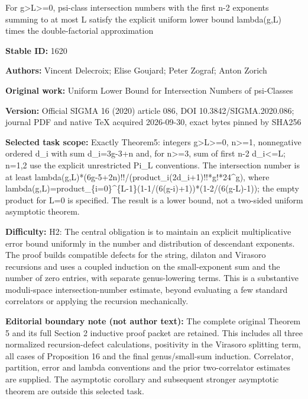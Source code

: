 \documentclass[11pt]{article}
\theoremstyle{definition}
\begin{document}
\begin{center}\Large For g>L>=0, psi-class intersection numbers with the first n-2 exponents summing to at most L satisfy the explicit uniform lower bound lambda(g,L) times the double-factorial approximation\end{center}
\noindent\textbf{Stable ID:} 1620\par
\noindent\textbf{Authors:} Vincent Delecroix; Elise Goujard; Peter Zograf; Anton Zorich\par
\noindent\textbf{Original work:} Uniform Lower Bound for Intersection Numbers of psi-Classes\par
\noindent\textbf{Version:} Official SIGMA 16 (2020) article 086, DOI 10.3842/SIGMA.2020.086; journal PDF and native TeX acquired 2026-09-30, exact bytes pinned by SHA256\par
\noindent\textbf{Selected task scope:} Exactly Theorem5: integers g>L>=0, n>=1, nonnegative ordered d\_i with sum d\_i=3g-3+n and, for n>=3, sum of first n-2 d\_i<=L; n=1,2 use the explicit unrestricted Pi\_L conventions. The intersection number is at least lambda(g,L)*(6g-5+2n)!!/(product\_i(2d\_i+1)!!*g!*24\textasciicircum{}g), where lambda(g,L)=product\_\{i=0\}\textasciicircum{}\{L-1\}(1-1/(6(g-i)+1))*(1-2/(6(g-L)-1)); the empty product for L=0 is specified. The result is a lower bound, not a two-sided uniform asymptotic theorem.\par
\noindent\textbf{Difficulty:} H2: The central obligation is to maintain an explicit multiplicative error bound uniformly in the number and distribution of descendant exponents. The proof builds compatible defects for the string, dilaton and Virasoro recursions and uses a coupled induction on the small-exponent sum and the number of zero entries, with separate genus-lowering terms. This is a substantive moduli-space intersection-number estimate, beyond evaluating a few standard correlators or applying the recursion mechanically.\par
\noindent\textbf{Editorial boundary note (not author text):} The complete original Theorem 5 and its full Section 2 inductive proof packet are retained. This includes all three normalized recursion-defect calculations, positivity in the Virasoro splitting term, all cases of Proposition 16 and the final genus/small-sum induction. Correlator, partition, error and lambda conventions and the prior two-correlator estimates are supplied. The asymptotic corollary and subsequent stronger asymptotic theorem are outside this selected task.\par
\end{document}
